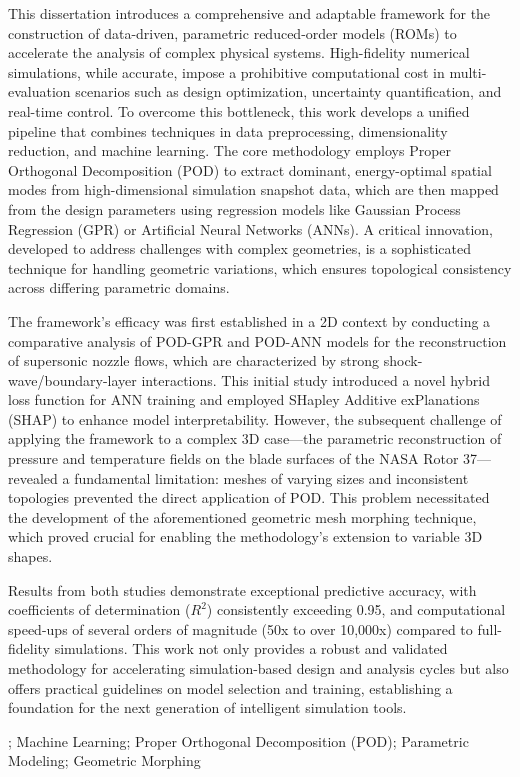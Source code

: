 \documentclass[dsc, EN]{ufabcFHZh}
\begin{document}
\begin{foreignabstract}
This dissertation introduces a comprehensive and adaptable framework for the construction of data-driven, parametric reduced-order models (ROMs) to accelerate the analysis of complex physical systems. High-fidelity numerical simulations, while accurate, impose a prohibitive computational cost in multi-evaluation scenarios such as design optimization, uncertainty quantification, and real-time control. To overcome this bottleneck, this work develops a unified pipeline that combines techniques in data preprocessing, dimensionality reduction, and machine learning. The core methodology employs Proper Orthogonal Decomposition (POD) to extract dominant, energy-optimal spatial modes from high-dimensional simulation snapshot data, which are then mapped from the design parameters using regression models like Gaussian Process Regression (GPR) or Artificial Neural Networks (ANNs). A critical innovation, developed to address challenges with complex geometries, is a sophisticated technique for handling geometric variations, which ensures topological consistency across differing parametric domains.

The framework's efficacy was first established in a 2D context by conducting a comparative analysis of POD-GPR and POD-ANN models for the reconstruction of supersonic nozzle flows, which are characterized by strong shock-wave/boundary-layer interactions. This initial study introduced a novel hybrid loss function for ANN training and employed SHapley Additive exPlanations (SHAP) to enhance model interpretability. However, the subsequent challenge of applying the framework to a complex 3D case—the parametric reconstruction of pressure and temperature fields on the blade surfaces of the NASA Rotor 37—revealed a fundamental limitation: meshes of varying sizes and inconsistent topologies prevented the direct application of POD. This problem necessitated the development of the aforementioned geometric mesh morphing technique, which proved crucial for enabling the methodology's extension to variable 3D shapes.

Results from both studies demonstrate exceptional predictive accuracy, with coefficients of determination ($R^2$) consistently exceeding 0.95, and computational speed-ups of several orders of magnitude (50x to over 10,000x) compared to full-fidelity simulations. This work not only provides a robust and validated methodology for accelerating simulation-based design and analysis cycles but also offers practical guidelines on model selection and training, establishing a foundation for the next generation of intelligent simulation tools.
\end{foreignabstract}
;
{Machine Learning};
{Proper Orthogonal Decomposition (POD)};
{Parametric Modeling};
{Geometric Morphing}
\end{document}

